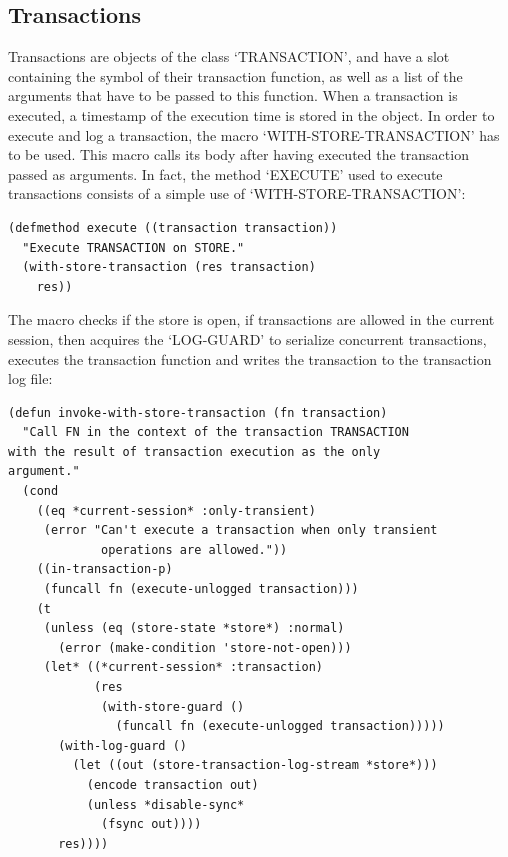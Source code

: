\subsection{ Transactions}

Transactions are objects of the class `TRANSACTION', and have a
slot containing the symbol of their transaction function, as well
as a list of the arguments that have to be passed to this
function. When a transaction is executed, a timestamp
of the execution time is stored in the object.
In order to execute and log a transaction, the macro
`WITH-STORE-TRANSACTION' has to be used. This macro calls its body
after having executed the transaction passed as arguments. In
fact, the method `EXECUTE' used to execute transactions consists
of a simple use of `WITH-STORE-TRANSACTION':

\begin{Verbatim}[fontsize=\small,frame=leftline,framerule=0.9mm,rulecolor=\color{gray},framesep=5.1mm,xleftmargin=5mm,fontfamily=cmtt]
(defmethod execute ((transaction transaction))
  "Execute TRANSACTION on STORE."
  (with-store-transaction (res transaction)
    res))
\end{Verbatim}
The macro checks if the store is open, if transactions are allowed
in the current session, then acquires the `LOG-GUARD' to serialize
concurrent transactions, executes the transaction function and
writes the transaction to the transaction log file:

\begin{Verbatim}[fontsize=\small,frame=leftline,framerule=0.9mm,rulecolor=\color{gray},framesep=5.1mm,xleftmargin=5mm,fontfamily=cmtt]
(defun invoke-with-store-transaction (fn transaction)
  "Call FN in the context of the transaction TRANSACTION
with the result of transaction execution as the only
argument."
  (cond
    ((eq *current-session* :only-transient)
     (error "Can't execute a transaction when only transient
             operations are allowed."))
    ((in-transaction-p)
     (funcall fn (execute-unlogged transaction)))
    (t
     (unless (eq (store-state *store*) :normal)
       (error (make-condition 'store-not-open)))
     (let* ((*current-session* :transaction)
            (res
             (with-store-guard ()
               (funcall fn (execute-unlogged transaction)))))
       (with-log-guard ()
         (let ((out (store-transaction-log-stream *store*)))
           (encode transaction out)
           (unless *disable-sync*
             (fsync out))))
       res))))
\end{Verbatim}


